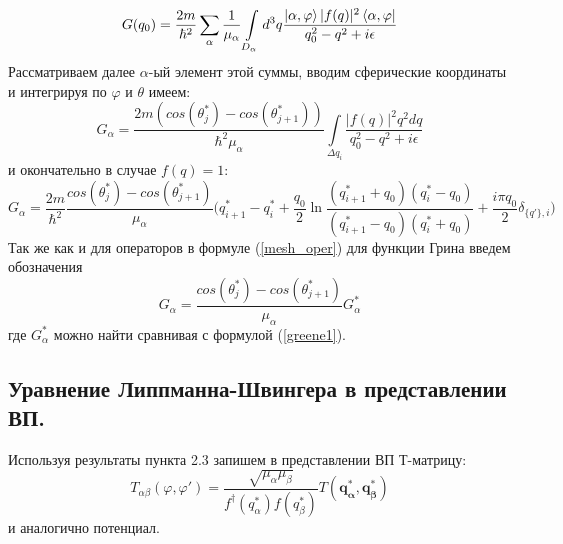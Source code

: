 \documentclass[a4paper,12pt]{article}
\newcommand{\vect}[1]{\boldsymbol{#1}}
\begin{document}
\[
  G(q_0) = 
	\frac{2m}{\hbar^2}  \sum\limits_\alpha \frac{1}{ \mu_\alpha } \int\limits_{D_\alpha} d^3q 
		\frac{ \ket{\alpha,\varphi} |f(q)|^2 \bra{\alpha,\varphi} }{ q_0^2 - q^2 + i\epsilon } 
\]
Рассматриваем далее $\alpha$-ый элемент этой суммы, вводим сферические координаты и интегрируя по $\varphi$ и $\theta$ имеем:
\[
  G_\alpha = \frac{2m (cos(\theta_j^*)-cos(\theta_{j+1}^*))}{\hbar^2 \mu_\alpha} \int\limits_{\Delta q_i}
		\frac{ |f(q)|^2 q^2 dq }{ q_0^2 - q^2 + i\epsilon } 
\]
и окончательно в случае $f(q)=1$:
\begin{equation}
  \label{greene1}
  G_\alpha = \frac{2m}{\hbar^2} \frac{cos(\theta_j^*)-cos(\theta_{j+1}^*)}{\mu_\alpha}
		\bigg( 
			q_{i+1}^* - q_i^* + \frac{q_0}{2}\ln\frac{(q_{i+1}^* +q_0)(q_i^* -q_0)}{(q_{i+1}^* -q_0)(q_i^* +q_0)} + \frac{i\pi q_0}{2}\delta_{\{q'\},i}
		\bigg)
\end{equation}
Так же как и для операторов в формуле (\ref{mesh_oper}) для функции Грина введем обозначения
\begin{equation}
    \label{mesh_greene}
    G_\alpha = \frac{cos(\theta_j^*)-cos(\theta_{j+1}^*)}{\mu_\alpha} G^*_\alpha
\end{equation} где $G^*_\alpha$ можно найти сравнивая с формулой (\ref{greene1}). %

\newline
\subsection{Уравнение Липпманна-Швингера в представлении ВП.}

Используя результаты пункта 2.3 запишем в представлении ВП Т-матрицу:
\begin{equation}
	T_{\alpha\beta}(\varphi,\varphi') = \frac{\sqrt{\mu_\alpha \mu_\beta}}{ f^\dagger(q_\alpha^*)f(q_\beta^*) } T(\vect{q^*_\alpha},\vect{q^*_\beta})
\end{equation}
и аналогично потенциал.
\end{document}
